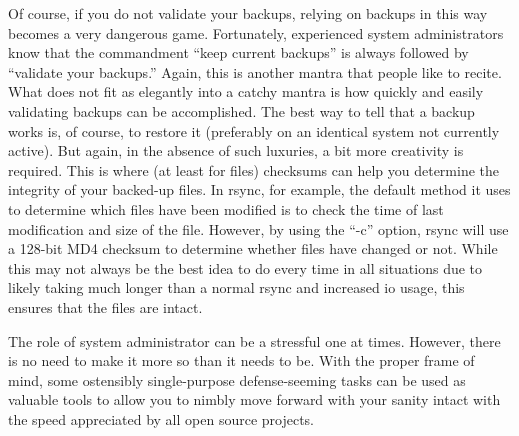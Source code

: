 Of course, if you do not validate your backups, relying on backups in this way
becomes a very dangerous game.  Fortunately, experienced system administrators
know that the commandment ``keep current backups'' is always followed by ``validate
your backups.'' Again, this is another mantra that people like to recite.  What
does not fit as elegantly into a catchy mantra is how quickly and easily
validating backups can be accomplished. The best way to tell that a backup works
is, of course, to restore it (preferably on an identical system not currently
active). But again, in the absence of such luxuries, a bit more creativity is
required. This is where (at least for files) checksums can help you determine
the integrity of your backed-up files. In rsync, for example, the default method
it uses to determine which files have been modified is to check the time of last
modification and size of the file.  However, by using the “-c” option, rsync
will use a 128-bit MD4 checksum to determine whether files have changed or not.
While this may not always be the best idea to do every time in all situations
due to likely taking much longer than a normal rsync and increased io usage,
this ensures that the files are intact.

The role of system administrator can be a stressful one at times.  However,
there is no need to make it more so than it needs to be.  With the proper frame
of mind, some ostensibly single-purpose defense-seeming tasks can be used as
valuable tools to allow you to nimbly move forward with your sanity intact with
the speed appreciated by all open source projects.
